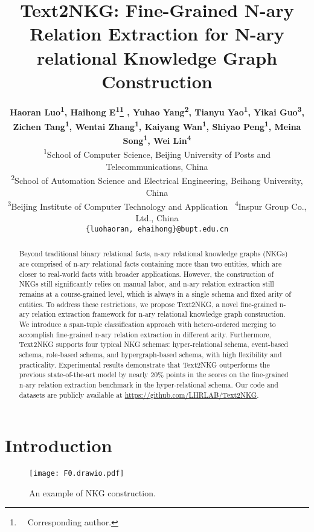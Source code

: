 \documentclass{article} \usepackage{iclr2024_conference,times}
\title{Text2NKG: Fine-Grained N-ary Relation Extraction for N-ary relational Knowledge Graph Construction}
\author{{\bf Haoran Luo\textsuperscript{\rm 1}, Haihong E\textsuperscript{\rm 1}\thanks{\ \ Corresponding author.}  , Yuhao Yang\textsuperscript{\rm 2}, Tianyu Yao\textsuperscript{\rm 1}, Yikai Guo\textsuperscript{\rm 3},} \\{\bf Zichen Tang\textsuperscript{\rm 1}, Wentai Zhang\textsuperscript{\rm 1}, Kaiyang Wan\textsuperscript{\rm 1}, Shiyao Peng\textsuperscript{\rm 1}, Meina Song\textsuperscript{\rm 1}, Wei Lin\textsuperscript{\rm 4}} \\
         \textsuperscript{1}School of Computer Science, Beijing University of Posts and Telecommunications, China \\ 
         \textsuperscript{2}School of Automation Science and Electrical Engineering, Beihang University, China \\ 
         \textsuperscript{3}Beijing Institute of Computer Technology and Application 
         \ \textsuperscript{4}Inspur Group Co., Ltd., China \\ 
         \texttt{\{luohaoran, ehaihong\}@bupt.edu.cn}}
\begin{document}
\maketitle

\begin{abstract}
Beyond traditional binary relational facts, n-ary relational knowledge graphs (NKGs) are comprised of n-ary relational facts containing more than two entities, which are closer to real-world facts with broader applications. However, the construction of NKGs still significantly relies on manual labor, and n-ary relation extraction still remains at a course-grained level, which is always in a single schema and fixed arity of entities. To address these restrictions, we propose Text2NKG, a novel fine-grained n-ary relation extraction framework for n-ary relational knowledge graph construction. We introduce a span-tuple classification approach with hetero-ordered merging to accomplish fine-grained n-ary relation extraction in different arity. Furthermore, Text2NKG supports four typical NKG schemas: hyper-relational schema, event-based schema, role-based schema, and hypergraph-based schema, with high flexibility and practicality. Experimental results demonstrate that Text2NKG outperforms the previous state-of-the-art model by nearly 20\% points in the  scores on the fine-grained n-ary relation extraction benchmark in the hyper-relational schema. Our code and datasets are publicly available at \url{https://github.com/LHRLAB/Text2NKG}.
\end{abstract}

\section{Introduction}
\label{introduction}


\begin{wrapfigure}{r}{0.5\textwidth}
\vspace{-5mm}
\centering
\texttt{[image: F0.drawio.pdf]}
\caption{An example of NKG construction.}
\label{f0}
\vspace{-2mm}
\end{wrapfigure}
\end{document}
